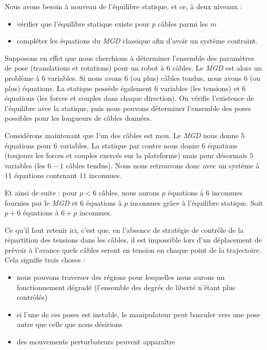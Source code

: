 Nous avons besoin à nouveau de l'équilibre statique, et ce, à deux niveaux :
\begin{itemize}
 \item vérifier que l'équilibre statique existe pour $p$ câbles parmi les $m$
 \item compléter les équations du {\it MGD} classique afin d'avoir un système contraint.
\end{itemize}

Supposons en effet que nous cherchions à déterminer l'ensemble des paramètres de pose (translations et rotations) pour un robot à $6$ câbles. Le {\it MGD} est alors un problème à $6$ variables. Si nous avons 6 (ou plus) câbles tendus, nous avons $6$ (ou plus) équations. La statique possède également $6$ variables (les tensions) et $6$ équations (les forces et couples dans chaque direction). On vérifie l'existence de l'équilibre avec la statique, puis nous pouvons déterminer l'ensemble des poses possibles pour les longueurs de câbles données.

Considérons maintenant que l'un des câbles est mou. Le {\it MGD} nous donne $5$ équations pour $6$ variables. La statique par contre nous donne $6$ équations (toujours les forces et couples exercés sur la plateforme) mais pour désormais $5$ variables (les $6-1$ câbles tendus). Nous nous retrouvons donc avec un système à $11$ équations contenant $11$ inconnues.

Et ainsi de suite : pour $p < 6$ câbles, nous aurons $p$ équations à $6$ inconnues fournies par le {\it MGD} et $6$ équations à $p$ inconnues grâce à l'équilibre statique. Soit $p+6$ équations à $6+p$ inconnues.

Ce qu'il faut retenir ici, c'est que, en l'absence de stratégie de contrôle de la répartition des tensions dans les câbles, il est impossible lors d'un déplacement de prévoir à l'avance quels câbles seront en tension en chaque point de la trajectoire. Cela signifie trois choses :
\begin{itemize}
 \item nous pouvons traverser des régions pour lesquelles nous aurons un fonctionnement dégradé (l'ensemble des degrés de liberté n'étant plus contrôlés)
 \item si l'une de ces poses est instable, le manipulateur peut basculer vers une pose autre que celle que nous désirions
 \item des mouvements perturbateurs peuvent apparaître
\end{itemize}

